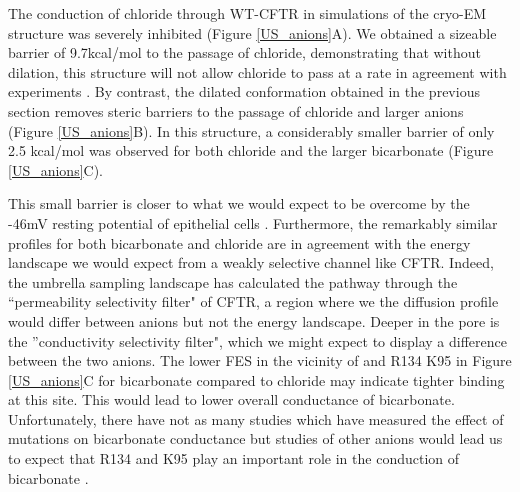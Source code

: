 The conduction of chloride through WT-CFTR in simulations of the cryo-EM structure was severely inhibited (Figure \ref{US_anions}A). We obtained a sizeable barrier of 9.7kcal/mol to the passage of chloride, demonstrating that without dilation, this structure will not allow chloride to pass at a rate in agreement with experiments \cite{gong2004}. By contrast, the dilated conformation obtained in the previous section removes steric barriers to the passage of chloride and larger anions (Figure \ref{US_anions}B). In this structure, a considerably smaller barrier of only 2.5 kcal/mol was observed for both chloride and the larger bicarbonate (Figure \ref{US_anions}C). 

This small barrier is closer to what we would expect to be overcome by the -46mV resting potential of epithelial cells \cite{josephson1979}. Furthermore, the remarkably similar profiles for both bicarbonate and chloride are in agreement with the energy landscape we would expect from a weakly selective channel like CFTR. Indeed, the umbrella sampling landscape has calculated the pathway through the ``permeability selectivity filter" of CFTR, a region where we the diffusion profile would differ between anions but not the energy landscape. Deeper in the pore is the ''conductivity selectivity filter", which we might expect to display a difference between the two anions. The lower FES in the vicinity of and R134 K95 in Figure \ref{US_anions}C for bicarbonate compared to chloride may indicate tighter binding at this site. This would lead to lower overall conductance of bicarbonate. Unfortunately, there have not as many studies which have measured the effect of mutations on bicarbonate conductance but studies of other anions would lead us to expect that R134 and K95 play an important role in the conduction of bicarbonate \cite{linsdell2016}. 

